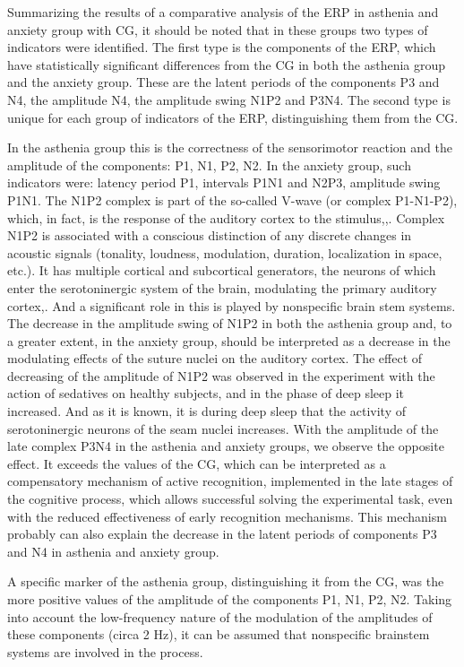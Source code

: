 \documentclass[twocolumn]{article}
\begin{document}
\par Summarizing the results of a comparative analysis of the ERP in asthenia and anxiety group with CG, it should be noted that in these groups two types of indicators were identified. The first type is the components of the ERP, which have statistically significant differences from the CG in both the asthenia group and the anxiety group. These are the latent periods of the components P3 and N4, the amplitude N4, the amplitude swing N1P2 and P3N4. The second type is unique for each group of indicators of the ERP, distinguishing them from the CG.
\par In the asthenia group this is the correctness of the sensorimotor reaction and the amplitude of the components: P1, N1, P2, N2. In the anxiety group, such indicators were: latency period P1, intervals P1N1 and N2P3, amplitude swing P1N1. The N1P2 complex is part of the so-called V-wave (or complex P1-N1-P2), which, in fact, is the response of the auditory cortex to the stimulus\cite{bib28},\cite{bib29},\cite{bib30}. Complex N1P2 is associated with a conscious distinction of any discrete changes in acoustic signals (tonality, loudness, modulation, duration, localization in space, etc.)\cite{bib31}. It has multiple cortical and subcortical generators, the neurons of which enter the serotoninergic system of the brain, modulating the primary auditory cortex\cite{bib32},\cite{bib33}. And a significant role in this is played by nonspecific brain stem systems\cite{bib34}. The decrease in the amplitude swing of N1P2 in both the asthenia group and, to a greater extent, in the anxiety group, should be interpreted as a decrease in the modulating effects of the suture nuclei on the auditory cortex. The effect of decreasing of the amplitude of N1P2 was observed in the experiment with the action of sedatives on healthy subjects, and in the phase of deep sleep it increased\cite{bib35}. And as it is known, it is during deep sleep that the activity of serotoninergic neurons of the seam nuclei increases. With the amplitude of the late complex P3N4 in the asthenia and anxiety groups, we observe the opposite effect. It exceeds the values of the CG, which can be interpreted as a compensatory mechanism of active recognition, implemented in the late stages of the cognitive process, which allows successful solving the experimental task, even with the reduced effectiveness of early recognition mechanisms. This mechanism probably can also explain the decrease in the latent periods of components P3 and N4 in asthenia and anxiety group.
\par A specific marker of the asthenia group, distinguishing it from the CG, was the more positive values of the amplitude of the components P1, N1, P2, N2. Taking into account the low-frequency nature of the modulation of the amplitudes of these components (circa 2 Hz), it can be assumed that nonspecific brainstem systems are involved in the process.
\end{document}
